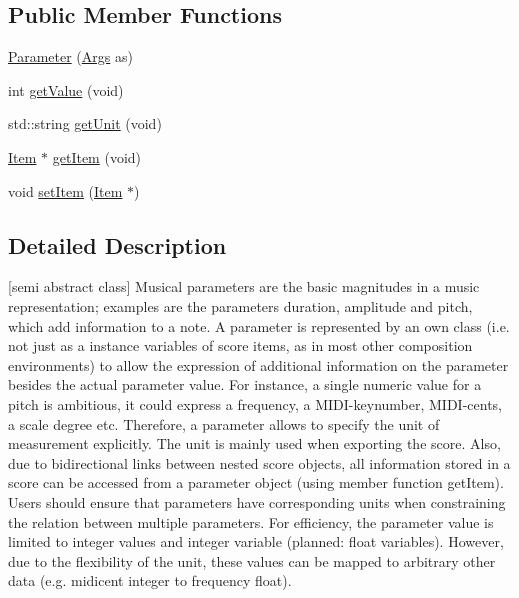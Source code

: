 \subsection*{Public Member Functions}
\begin{DoxyCompactItemize}
\item 
\hyperlink{class_parameter_a254b32e69ff3548d6e7fd04347fdd5cf}{Parameter} (\hyperlink{_score_core___score_object_8h_ab88aad89d974920ebfb0b0c9e46f61b4}{Args} as)
\item 
int \hyperlink{class_parameter_a4459b636c3993ba40664ce8a53dad2c1}{get\-Value} (void)
\item 
std\-::string \hyperlink{class_parameter_a0688af42890903c327ccf0b2373bff34}{get\-Unit} (void)
\item 
\hyperlink{class_item}{Item} $\ast$ \hyperlink{class_parameter_ac2009f29ab47b8b68ae8739b348ec2c2}{get\-Item} (void)
\item 
void \hyperlink{class_parameter_ae7ac31fdbb6079bd96b3ab1034d127e0}{set\-Item} (\hyperlink{class_item}{Item} $\ast$)
\end{DoxyCompactItemize}


\subsection{Detailed Description}
\mbox{[}semi abstract class\mbox{]} Musical parameters are the basic magnitudes in a music representation; examples are the parameters duration, amplitude and pitch, which add information to a note. A parameter is represented by an own class (i.\-e. not just as a instance variables of score items, as in most other composition environments) to allow the expression of additional information on the parameter besides the actual parameter value. For instance, a single numeric value for a pitch is ambitious, it could express a frequency, a M\-I\-D\-I-\/keynumber, M\-I\-D\-I-\/cents, a scale degree etc. Therefore, a parameter allows to specify the unit of measurement explicitly. The unit is mainly used when exporting the score. Also, due to bidirectional links between nested score objects, all information stored in a score can be accessed from a parameter object (using member function get\-Item). Users should ensure that parameters have corresponding units when constraining the relation between multiple parameters. For efficiency, the parameter value is limited to integer values and integer variable (planned\-: float variables). However, due to the flexibility of the unit, these values can be mapped to arbitrary other data (e.\-g. midicent integer to frequency float). 

